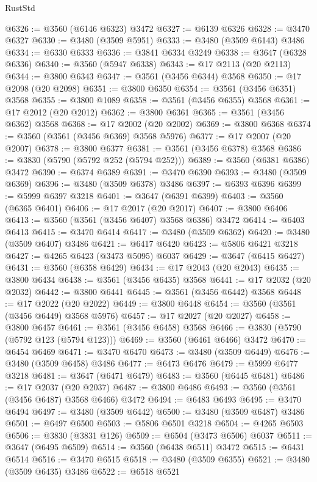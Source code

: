 \begin{lexlean}{RustStd}
\begin{coremodule}
{\begin{coremodule}
{{{{{{{{{{{{{{{{{{{{{{{{{{{{{{{{{{{{{{{{{{{{{@6326 := @3560 (@6146 @6323) @3472
@6327 := @6139 @6326
@6328 := @3470 @6327
@6330 := @3480 (@3509 @5951)
@6333 := @3480 (@3509 @6143) @3486
@6334 := @6330 @6333
@6336 := @3841 @6334 @3249
@6338 := @3647 (@6328 @6336)
@6340 := @3560 (@5947 @6338)
@6343 := @17 @2113 (@20 @2113)
@6344 := @3800 @6343
@6347 := @3561 (@3456 @6344) @3568
@6350 := @17 @2098 (@20 @2098)
@6351 := @3800 @6350
@6354 := @3561 (@3456 @6351) @3568
@6355 := @3800 @1089
@6358 := @3561 (@3456 @6355) @3568
@6361 := @17 @2012 (@20 @2012)
@6362 := @3800 @6361
@6365 := @3561 (@3456 @6362) @3568
@6368 := @17 @2002 (@20 @2002)
@6369 := @3800 @6368
@6374 := @3560 (@3561 (@3456 @6369) @3568 @5976)
@6377 := @17 @2007 (@20 @2007)
@6378 := @3800 @6377
@6381 := @3561 (@3456 @6378) @3568
@6386 := @3830 (@5790 (@5792 @252 (@5794 @252)))
@6389 := @3560 (@6381 @6386) @3472
@6390 := @6374 @6389
@6391 := @3470 @6390
@6393 := @3480 (@3509 @6369)
@6396 := @3480 (@3509 @6378) @3486
@6397 := @6393 @6396
@6399 := @5999 @6397 @3218
@6401 := @3647 (@6391 @6399)
@6403 := @3560 (@6365 @6401)
@6406 := @17 @2017 (@20 @2017)
@6407 := @3800 @6406
@6413 := @3560 (@3561 (@3456 @6407) @3568 @6386) @3472
@6414 := @6403 @6413
@6415 := @3470 @6414
@6417 := @3480 (@3509 @6362)
@6420 := @3480 (@3509 @6407) @3486
@6421 := @6417 @6420
@6423 := @5806 @6421 @3218
@6427 := @4265 @6423 (@3473 @5095) @6037
@6429 := @3647 (@6415 @6427)
@6431 := @3560 (@6358 @6429)
@6434 := @17 @2043 (@20 @2043)
@6435 := @3800 @6434
@6438 := @3561 (@3456 @6435) @3568
@6441 := @17 @2032 (@20 @2032)
@6442 := @3800 @6441
@6445 := @3561 (@3456 @6442) @3568
@6448 := @17 @2022 (@20 @2022)
@6449 := @3800 @6448
@6454 := @3560 (@3561 (@3456 @6449) @3568 @5976)
@6457 := @17 @2027 (@20 @2027)
@6458 := @3800 @6457
@6461 := @3561 (@3456 @6458) @3568
@6466 := @3830 (@5790 (@5792 @123 (@5794 @123)))
@6469 := @3560 (@6461 @6466) @3472
@6470 := @6454 @6469
@6471 := @3470 @6470
@6473 := @3480 (@3509 @6449)
@6476 := @3480 (@3509 @6458) @3486
@6477 := @6473 @6476
@6479 := @5999 @6477 @3218
@6481 := @3647 (@6471 @6479)
@6483 := @3560 (@6445 @6481)
@6486 := @17 @2037 (@20 @2037)
@6487 := @3800 @6486
@6493 := @3560 (@3561 (@3456 @6487) @3568 @6466) @3472
@6494 := @6483 @6493
@6495 := @3470 @6494
@6497 := @3480 (@3509 @6442)
@6500 := @3480 (@3509 @6487) @3486
@6501 := @6497 @6500
@6503 := @5806 @6501 @3218
@6504 := @4265 @6503
@6506 := @3830 (@3831 @126)
@6509 := @6504 (@3473 @6506) @6037
@6511 := @3647 (@6495 @6509)
@6514 := @3560 (@6438 @6511) @3472
@6515 := @6431 @6514
@6516 := @3470 @6515
@6518 := @3480 (@3509 @6355)
@6521 := @3480 (@3509 @6435) @3486
@6522 := @6518 @6521
}}}}}}}}}}}}}}}}}}}}}}}}}}}}}}}}}}}}}}}}}}}}}
\end{coremodule}}
\end{coremodule}
\end{lexlean}
